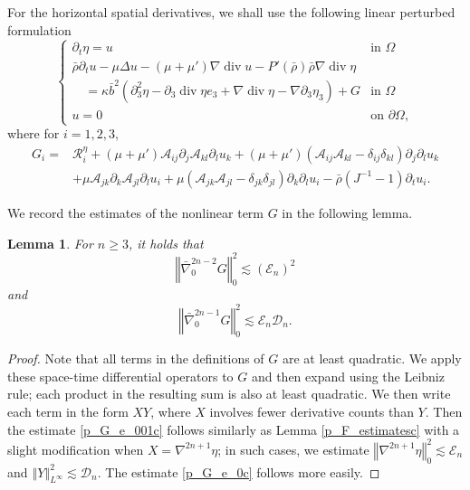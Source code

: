 \documentclass[a4paper,reqno,11pt]{amsart}
\numberwithin{equation}{section}
\providecommand{\norm}[1]{\left\Vert#1\right\Vert}
\providecommand{\sd}[1]{\mathcal{D}_{#1}}
\providecommand{\se}[1]{\mathcal{E}_{#1}}
\providecommand{\ns}[1]{\norm{#1}^2}
\providecommand{\norm}[1]{\left\Vert#1\right\Vert}
\newtheorem{lem}{Lemma}[section]
\begin{document}
For the horizontal spatial derivatives, we shall use the following linear perturbed formulation
\begin{equation}\label{perturbc}
\begin{cases}
\partial_t\eta=u & \text{in }
\Omega
 \\ \bar\rho\partial_t u -\mu\Delta  {u}-(\mu+\mu')\nabla \operatorname{div} u -P '(\bar{\rho} )\bar\rho \nabla \operatorname{div} \eta
 &\\\quad=\kappa\bar b^2\left( {\partial}_3^2\eta- {\partial}_3\operatorname{div} \eta e_3+\nabla\operatorname{div} \eta- \nabla{\partial}_3\eta_3\right)+ G & \text{in }
\Omega \\
u= 0 &\text{on }{\partial}\Omega,
\end{cases}
\end{equation}
where for $i=1,2,3,$
\begin{equation}
\begin{split}
G_i=&\mathcal{R}_i^\eta+(\mu+\mu') {\mathcal{A}}_{ij}{\partial}_j{\mathcal{A}}_{kl}{\partial}_l u_k+(\mu+\mu')({\mathcal{A}}_{ij}{\mathcal{A}}_{kl}-\delta_{ij}\delta_{kl}){\partial}_j{\partial}_l u_k
\\&+\mu {\mathcal{A}}_{jk}{\partial}_k{\mathcal{A}}_{jl}{\partial}_l u_i+\mu({\mathcal{A}}_{jk}{\mathcal{A}}_{jl}-\delta_{jk}\delta_{jl}){\partial}_k{\partial}_l u_i-\bar \rho (J^{-1}-1)\partial_t u_i.
\end{split}
\end{equation}

We record the estimates of the nonlinear term $G$ in the following lemma.
\begin{lem}\label{p_G_estimatesc}
For $n\ge 3$, it holds that
 \begin{equation}\label{p_G_e_0c}
  \ns{ \bar{\nabla}_0^{2n-2} G}_{0}   {\lesssim}  (\se{n})^2
 \end{equation}
and
\begin{equation}\label{p_G_e_001c}
\ns{ \bar{\nabla}_0^{2n-1} G}_{0}   {\lesssim}  \se{n}\sd{n}.
\end{equation}
\end{lem}
\begin{proof}
Note that all terms in the definitions of $G$ are at least quadratic. We apply these
space-time differential operators to $G$ and then expand using the Leibniz rule; each product in
the resulting sum is also at least quadratic. We then write each term in the form $X Y$, where $X$ involves fewer derivative counts than $Y$. Then the estimate \eqref{p_G_e_001c} follows similarly as Lemma \ref{p_F_estimatesc} with a slight modification when $X=\nabla^{2n+1} \eta$; in such cases, we estimate $\norm{\nabla^{2n+1}\eta}_{0}^2{\lesssim} \se{n}$ and $\norm{Y}_{L^\infty}^2{\lesssim} \sd{n}$. The estimate \eqref{p_G_e_0c} follows more easily.
\end{proof}
\end{document}

